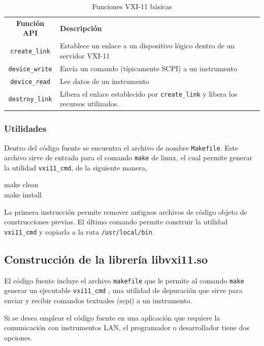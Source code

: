 \documentclass[paper=letter,oneside,fontsize=11pt, parskip=full]{scrartcl}
\newenvironment{code}
	{\begin{adjustwidth}{1.5cm}{0.0cm}\ttfamily}
	{\end{adjustwidth}}
\begin{document}
		\begin{table}
			\begin{tabular}{cl}
				\textbf{Función API} 	& \textbf{Descripción} \\
				\texttt{create\_link}	& Establece un enlace a un dispositivo lógico dentro de un servidor VXI-11 \\
				\texttt{device\_write}	& Envía un comando (típicamente SCPI) a un instrumento \\
				\texttt{device\_read}	& Lee datos de un instrumento \\
				\texttt{destroy\_link}	& Libera el enlace establecido por \texttt{create\_link} y libera los recursos utilizados.				
			\end{tabular}
			\caption{Funciones VXI-11 básicas}
			\label{Tab:FuncionesVXI11Basicas}
		\end{table}
	
	\subsubsection{Utilidades}
	
	Dentro del código fuente se encuentra el archivo de nombre \texttt{Makefile}. Este archivo sirve de entrada para el comando \texttt{make} de linux, el cual permite generar la utilidad \texttt{vxi11\_cmd}, de la siguiente manera,
	
	\begin{code}
		make clean \\
		make install		
	\end{code}
	
	La primera instrucción permite remover antiguos archivos de código objeto de construcciones previas. El último comando permite construir la utilidad \texttt{vxi11\_cmd} y copiarla a la ruta \texttt{/usr/local/bin}.	
	
	\subsection{Construcción de la librería libvxi11.so}	
	
	El código fuente incluye el archivo \texttt{makefile} que le permite al comando \texttt{make} generar un ejecutable  \texttt{vxi11\_cmd} , una utilidad de depuración que sirve para enviar y recibir comandos textuales (scpi) a un instrumento.

	Si se desea emplear el código fuente en una aplicación que requiere la comunicación con instrumentos LAN, el programador o 
	desarrollador tiene dos opciones.
	
\end{document}
